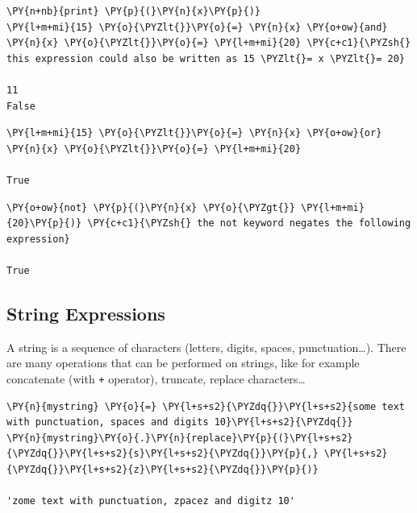 \begin{codebox}[breakable, size=fbox, boxrule=1pt, pad at break*=1mm, colback=cellbackground, colframe=cellborder]
\begin{Verbatim}[commandchars=\\\{\}]
\PY{n+nb}{print} \PY{p}{(}\PY{n}{x}\PY{p}{)}
\PY{l+m+mi}{15} \PY{o}{\PYZlt{}}\PY{o}{=} \PY{n}{x} \PY{o+ow}{and} \PY{n}{x} \PY{o}{\PYZlt{}}\PY{o}{=} \PY{l+m+mi}{20} \PY{c+c1}{\PYZsh{} this expression could also be written as 15 \PYZlt{}= x \PYZlt{}= 20}

11
False
\end{Verbatim}
\end{codebox}

\begin{codebox}[breakable, size=fbox, boxrule=1pt, pad at break*=1mm, colback=cellbackground, colframe=cellborder]            
\begin{Verbatim}[commandchars=\\\{\}]
\PY{l+m+mi}{15} \PY{o}{\PYZlt{}}\PY{o}{=} \PY{n}{x} \PY{o+ow}{or} \PY{n}{x} \PY{o}{\PYZlt{}}\PY{o}{=} \PY{l+m+mi}{20}

True
\end{Verbatim}
\end{codebox}

\begin{codebox}[breakable, size=fbox, boxrule=1pt, pad at break*=1mm, colback=cellbackground, colframe=cellborder]            
\begin{Verbatim}[commandchars=\\\{\}]
\PY{o+ow}{not} \PY{p}{(}\PY{n}{x} \PY{o}{\PYZgt{}} \PY{l+m+mi}{20}\PY{p}{)} \PY{c+c1}{\PYZsh{} the not keyword negates the following expression}

True
\end{Verbatim}
\end{codebox}

\subsection{String Expressions}\label{string-expressions}

A string is a sequence of characters (letters, digits, spaces, punctuation\ldots). There are many operations that can be performed on strings, like for example concatenate (with \texttt{+} operator), truncate, replace characters\ldots

\begin{codebox}[breakable, size=fbox, boxrule=1pt, pad at break*=1mm, colback=cellbackground, colframe=cellborder]            
\begin{Verbatim}[commandchars=\\\{\}]
\PY{n}{mystring} \PY{o}{=} \PY{l+s+s2}{\PYZdq{}}\PY{l+s+s2}{some text with punctuation, spaces and digits 10}\PY{l+s+s2}{\PYZdq{}}
\PY{n}{mystring}\PY{o}{.}\PY{n}{replace}\PY{p}{(}\PY{l+s+s2}{\PYZdq{}}\PY{l+s+s2}{s}\PY{l+s+s2}{\PYZdq{}}\PY{p}{,} \PY{l+s+s2}{\PYZdq{}}\PY{l+s+s2}{z}\PY{l+s+s2}{\PYZdq{}}\PY{p}{)}

'zome text with punctuation, zpacez and digitz 10'
\end{Verbatim}
\end{codebox}

